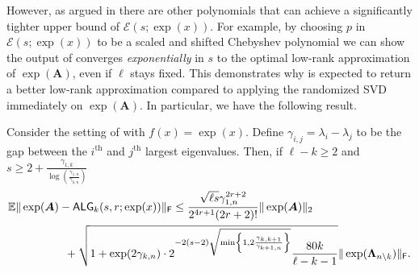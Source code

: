 However, as argued in  there are other polynomials that can achieve a significantly tighter upper bound of $\mathcal{E}(s;\exp(x))$. For example, by choosing $p$ in $\mathcal{E}(s;\exp(x))$ to be a scaled and shifted Chebyshev polynomial we can show the output of  converges \emph{exponentially} in $s$ to the optimal low-rank approximation of $\exp(\bm{A})$, even if $\ell$ stays fixed. 
 This demonstrates why  is expected to return a better low-rank approximation compared to applying the randomized SVD immediately on $\exp(\bm{A})$. In particular, we have the following result. 

\begin{corollary}\label{theorem:fast_convergence}
Consider the setting of  with $f(x) = \exp(x)$. Define $\gamma_{i,j} = \lambda_{i} - \lambda_{j}$ to be the gap between the $i^{\text{th}}$ and $j^{\text{th}}$ largest eigenvalues. Then, if $\ell-k\geq 2$ and $s \geq 2 + \frac{\gamma_{1,k}}{\log\left(\frac{\gamma_{1,n}}{\gamma_{k,n}}\right)}$%
\begin{align*}
     &\mathbb{E}\|\exp(\bm{A}) - \textsf{\textup{ALG}}_k(s,r;\exp(x))\|_{\textsf{\textup{F}}} 
     \leq  \frac{\sqrt{\ell s}\gamma_{1,n}^{2r+2}}{2^{4r+1}(2r+2)!}\|\exp(\bm{A})\|_2 
     \\&\hspace{5em}+ \sqrt{1 +  \exp(2\gamma_{k,n}) \cdot 2^{-2(s-2)\sqrt{\min\left\{1, 2 \frac{\gamma_{k,k+1}}{\gamma_{k+1,n}}\right\}}}\frac{80k}{\ell - k - 1}} \|\exp(\bm{\Lambda}_{n \setminus k })\|_{\textsf{\textup{F}}}.
\end{align*}
\end{corollary}

